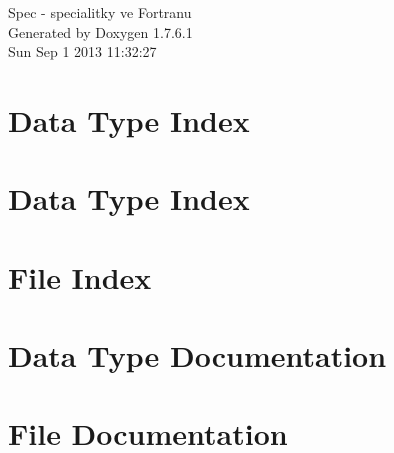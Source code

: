 \documentclass[a4paper]{book}
\begin{document}
\hypersetup{pageanchor=false,citecolor=blue}
\begin{titlepage}
\vspace*{7cm}
\begin{center}
{\Large \-Spec -\/ specialitky ve \-Fortranu }\\
\vspace*{1cm}
{\large \-Generated by Doxygen 1.7.6.1}\\
\vspace*{0.5cm}
{\small Sun Sep 1 2013 11:32:27}\\
\end{center}
\end{titlepage}
\clearemptydoublepage
{}
\tableofcontents
\clearemptydoublepage
{}
\hypersetup{pageanchor=true,citecolor=blue}
\chapter{\-Data \-Type \-Index}

\chapter{\-Data \-Type \-Index}

\chapter{\-File \-Index}

\chapter{\-Data \-Type \-Documentation}












\chapter{\-File \-Documentation}





\printindex
\end{document}
